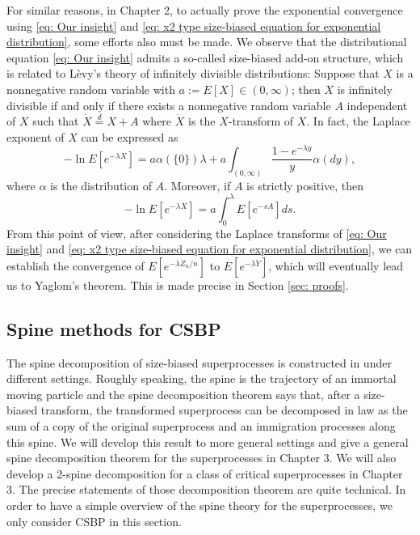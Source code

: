 \documentclass[UTF8]{pkuthss}
\theoremstyle{plain}
\theoremstyle{definition}
\numberwithin{equation}{section}
\begin{document}
For similar reasons, in Chapter 2,
to actually prove the exponential convergence using \eqref{eq: Our insight} and \eqref{eq: x2 type size-biased equation for exponential distribution}, some efforts also must be made.
We observe that the distributional equation \eqref{eq: Our insight} admits
a so-called size-biased add-on structure, which is related to L\`evy's
theory of infinitely divisible distributions: Suppose that $X$ is a nonnegative random variable with
$ a := E [X]\in (0,\infty)$; then
$X$ is infinitely divisible if and only if there exists a nonnegative random variable $A$ independent of $X$ such that $\dot X 	\overset{d} = X + A$ where $\dot X$ is the $X$-transform of $X$.
In fact,
the Laplace exponent of $X$ can be expressed as
\[
-\ln E[ e^{-\lambda X}]
=  a \alpha(\{0\}) \lambda+ a \int_{(0,\infty)} \frac{1 - e^{-\lambda y}}{y} \alpha(dy),
\]
where $\alpha$ is the distribution of $A$.
Moreover, if $A$ is strictly positive, then
\[
-\ln E[ e^{-\lambda X}]
=  a  \int_0^\lambda E [e^{-s A}] ds.
\]
From this point of view, after considering the Laplace transforms of
\eqref{eq: Our insight} and \eqref{eq: x2 type size-biased equation for exponential distribution}, we can establish the convergence of $E[e^{-\lambda \dot Z_n/n}]$ to $E[e^{-\lambda \dot {Y}}]$, which will eventually lead us to Yaglom's theorem.
This is made precise in Section \ref{sec: proofs}. 

\subsection{Spine methods for CSBP}

The spine decomposition of size-biased superprocesses is constructed in \cite{EckhoffKyprianouWinkel2015Spines, EnglanderKyprianou2004Local, LiuRenSong2009Log} under different settings. Roughly speaking, the spine is the trajectory of an immortal moving particle and the spine decomposition theorem says that, after a size-biased transform, the transformed superprocess can be decomposed in law as the sum of a copy of the original superprocess and an immigration processes along this spine. 
We will develop this result to more general settings and give a general spine decomposition theorem for the superprocesses in Chapter 3. 
We will also develop a 2-spine decomposition for a class of critical superprocesses in Chapter 3. 
The precise statements of those decomposition theorem are quite technical. In order to have a simple overview of the spine theory for the superprocesses, we only consider CSBP in this section.
	
\end{document}
